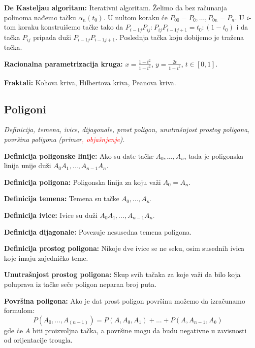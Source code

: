 \documentclass[12pt]{article}
\newcommand{\ocena}[1]{\textcolor{red}{#1}}
\begin{document}
\textbf{De Kasteljau algoritam:} Iterativni algoritam. Želimo da bez računanja
polinoma nađemo tačku $\alpha_n(t_0)$. U nultom koraku će
$P_{00}=P_0,\dotsc,P_{0n}=P_n$. U $i$-tom koraku konstruišemo tačke tako da
$P_{i-1j}P_{ij}:P_{ij}P_{i-1j+1}=t_0:(1-t_0)$ i da tačka $P_{ij}$ pripada duži
$P_{i-1j}P_{i-1j+1}$. Poslednja tačka koju dobijemo je tražena tačka.
\par

\textbf{Racionalna parametrizacija kruga:} $x=\frac{1-t^2}{1+t^2}$,
$y=\frac{2t}{1+t^2}$, $t\in[0,1]$.
\par

\textbf{Fraktali:} Kohova kriva, Hilbertova kriva, Peanova kriva.

\subsection{Poligoni}
\textit{Definicija, temena, ivice, dijagonale, prost poligon, unutrašnjost
    prostog poligona, površina poligona (primer\ocena{, objašnjenje}).}
\par
\vspace*{1cm}

\textbf{Definicija poligonske linije:} Ako su date tačke $A_0,\dotsc,A_n$, tada
je poligonska linija unije duži $A_0A_1,\dotsc,A_{n-1}A_n$.
\par

\textbf{Definicija poligona:} Poligonska linija za koju važi $A_0=A_n$.
\par

\textbf{Definicija temena:} Temena su tačke $A_0,\dotsc,A_n$.
\par

\textbf{Definicija ivice:} Ivice su duži $A_0A_1,\dotsc,A_{n-1}A_n$.
\par

\textbf{Definicija dijagonale:} Povezuje nesusedna temena poligona.
\par

\textbf{Definicija prostog poligona:} Nikoje dve ivice se ne seku, osim
susednih ivica koje imaju zajedničko teme.
\par

\textbf{Unutrašnjost prostog poligona:} Skup svih tačaka za koje važi da
bilo koja poluprava iz tačke seče poligon neparan broj puta.
\par

\textbf{Površina poligona:} Ako je dat prost poligon površinu možemo da
izračunamo formulom:
$$P(A_0,\dotsc,A_(n-1))=P(A,A_0,A_1)+\dotsc+P(A,A_{n-1},A_0)$$
gde će $A$ biti proizvoljna tačka, a površine mogu da budu negativne u
zavisnosti od orijentacije trougla.
\end{document}
